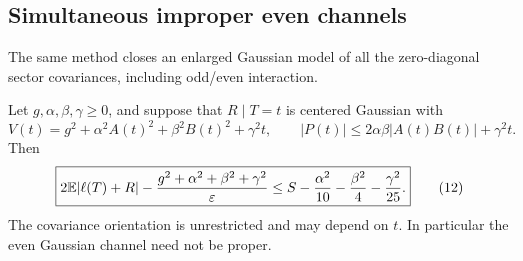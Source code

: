 \subsection{Simultaneous improper even channels}
The same method closes an enlarged Gaussian model of all the
zero-diagonal sector covariances, including odd/even interaction.

\begin{theorem}\label{polar:all}
Let $g,\alpha,\beta,\gamma\ge0$, and suppose that $R\mid T=t$ is
centered Gaussian with
\[
 V(t)=g^2+\alpha^2A(t)^2+\beta^2B(t)^2+\gamma^2t,
 \qquad |P(t)|\le2\alpha\beta|A(t)B(t)|+\gamma^2t.
\]
Then
\[
 \boxed{2\mathbb E|\ell(T)+R|-\frac{g^2+\alpha^2+\beta^2+\gamma^2}{\varepsilon}
 \le S-\frac{\alpha^2}{10}-\frac{\beta^2}{4}-\frac{\gamma^2}{25}.} \tag{12}
\]
The covariance orientation is unrestricted and may depend on $t$.
In particular the even Gaussian channel need not be proper.
\end{theorem}
